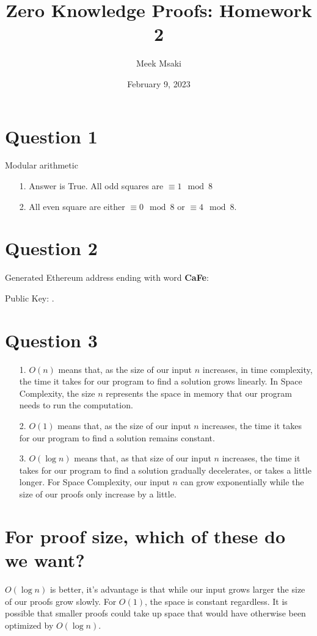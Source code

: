 \documentclass{article}
\title{Zero Knowledge Proofs: Homework 2}
\author{Meek Msaki}
\date{February 9, 2023}
\begin{document}
\maketitle

\section*{Question 1}
Modular arithmetic
\begin{itemize}
    \item [1.]Answer is True. All odd squares are $\equiv1\mod8$ 
    \item [2.]All even square are either $\equiv{0}\mod{8}$ or $\equiv4\mod8$.
\end{itemize}

\section*{Question 2}
Generated Ethereum address ending with word \textbf{CaFe}: 

Public Key: .

\section*{Question 3}
\begin{itemize}
    \item [1.]$O(n)$ means that, as the size of our input $n$ increases, in time complexity, the time it takes for our program to find a solution grows linearly. In Space Complexity, the size $n$ represents the space in memory that our program needs to run the computation.
    \item [2.]$O(1)$ means that, as the size of our input $n$ increases, the time it takes for our program to find a solution remains constant. 
    \item[3.]$O(\log{n})$ means that, as that size of our input $n$ increases, the time it takes for our program to find a solution gradually decelerates, or takes a little longer. For Space Complexity, our input $n$ can grow exponentially while the size of our proofs only increase by a little.  
\end{itemize}

\section*{For proof size, which of these do we want?}
$O(\log{n})$ is better, it's advantage is that while our input grows larger the size of our proofs grow slowly. For $O(1)$, the space is constant regardless. It is possible that smaller proofs could take up space that would have otherwise been optimized by $O(\log{n})$.
\end{document}

